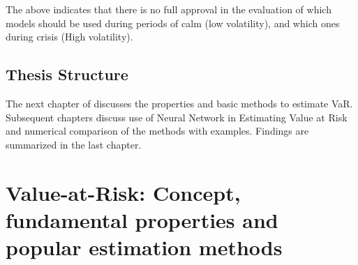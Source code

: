 \documentclass[a4paper,11pt,oneside]{book}
\begin{document}
The above indicates that there is no full approval in the evaluation of which models should be used during
periods of calm (low volatility), and which ones during crisis (High volatility).


\section{Thesis Structure}
The next chapter of discusses the properties and basic methods to estimate VaR. Subsequent chapters discuss use of Neural Network in Estimating Value at Risk and numerical comparison of the methods with examples. Findings are summarized in the last chapter.




\chapter{Value-at-Risk: Concept, fundamental properties and popular estimation
	methods}

\end{document}
